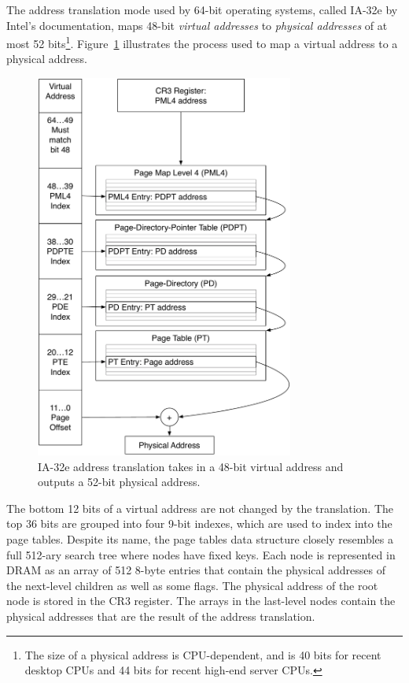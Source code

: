The address translation mode used by 64-bit operating systems, called
IA-32e by Intel's documentation, maps 48-bit \textit{virtual addresses} to
\textit{physical addresses} of at most 52 bits\footnote{The size of a
physical address is CPU-dependent, and is 40 bits for recent desktop CPUs and
44 bits for recent high-end server CPUs.}. Figure~\ref{fig:os_paging}
illustrates the process used to map a virtual address to a physical address.

\begin{figure}[hbtp]
  \centering
  \includegraphics[width=85mm]{figures/os_paging.pdf}
  \caption{
    IA-32e address translation takes in a 48-bit virtual address and outputs
    a 52-bit physical address.
  }
  \label{fig:os_paging}
\end{figure}

The bottom 12 bits of a virtual address are not changed by the translation. The
top 36 bits are grouped into four 9-bit indexes, which are used to index into
the page tables. Despite its name, the page tables data structure closely
resembles a full 512-ary search tree where nodes have fixed keys. Each
node is represented in DRAM as an array of 512 8-byte entries that contain the
physical addresses of the next-level children as well as some flags. The
physical address of the root node is stored in the CR3 register. The arrays in
the last-level nodes contain the physical addresses that are the result of the
address translation.

